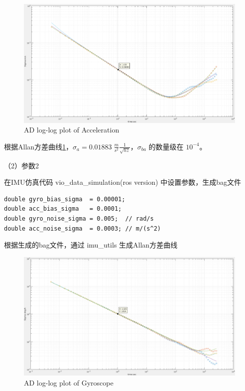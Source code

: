 \documentclass[12pt,a4paper]{article}
\begin{document}
\begin{enumerate}
\begin{figure}[htbp] 
\centering
\includegraphics[width=15cm]{imu_sim_01_acc.png} 
\caption{AD log-log plot of Acceleration}
\label{fig:ad12} 
\end{figure} 

根据Allan方差曲线\ref{fig:ad12}，$\sigma_a = 0.01883\;\frac{m}{s^2}\frac{1}{\sqrt{hz}}$，$\sigma_{ba}$ 的数量级在 $10^{-4}$。


\newpage

（2）参数2

在IMU仿真代码 vio\_data\_simulation(ros version) 中设置参数，生成bag文件

\begin{lstlisting}[frame=shadowbox]
double gyro_bias_sigma  = 0.00001;
double acc_bias_sigma   = 0.0001;
double gyro_noise_sigma = 0.005;  // rad/s
double acc_noise_sigma  = 0.0003; // m/(s^2)
\end{lstlisting}

根据生成的bag文件，通过 imu\_utils 生成Allan方差曲线

\begin{figure}[htbp] 
\centering
\includegraphics[width=15cm]{imu_sim_02_gyr.png} 
\caption{AD log-log plot of Gyroscope}
\label{fig:ad21} 
\end{figure} 


\end{enumerate}
\end{document}

